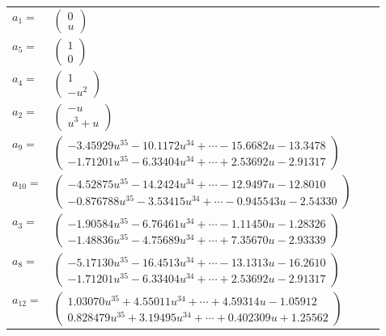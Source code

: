 \documentclass[1p]{elsarticle_modified}
\theoremstyle{definition}
\begin{document}
\begin{tabular}{m{7pt} m{180pt} m{7pt} m{180pt} }
\flushright $a_{1}=$&$\begin{pmatrix}0\\u\end{pmatrix}$ \\
\flushright $a_{5}=$&$\begin{pmatrix}1\\0\end{pmatrix}$ \\
\flushright $a_{4}=$&$\begin{pmatrix}1\\- u^2\end{pmatrix}$ \\
\flushright $a_{2}=$&$\begin{pmatrix}- u\\u^3+u\end{pmatrix}$ \\
\flushright $a_{9}=$&$\begin{pmatrix}-3.45929 u^{35}-10.1172 u^{34}+\cdots-15.6682 u-13.3478\\-1.71201 u^{35}-6.33404 u^{34}+\cdots+2.53692 u-2.91317\end{pmatrix}$ \\
\flushright $a_{10}=$&$\begin{pmatrix}-4.52875 u^{35}-14.2424 u^{34}+\cdots-12.9497 u-12.8010\\-0.876788 u^{35}-3.53415 u^{34}+\cdots-0.945543 u-2.54330\end{pmatrix}$ \\
\flushright $a_{3}=$&$\begin{pmatrix}-1.90584 u^{35}-6.76461 u^{34}+\cdots-1.11450 u-1.28326\\-1.48836 u^{35}-4.75689 u^{34}+\cdots+7.35670 u-2.93339\end{pmatrix}$ \\
\flushright $a_{8}=$&$\begin{pmatrix}-5.17130 u^{35}-16.4513 u^{34}+\cdots-13.1313 u-16.2610\\-1.71201 u^{35}-6.33404 u^{34}+\cdots+2.53692 u-2.91317\end{pmatrix}$ \\
\flushright $a_{12}=$&$\begin{pmatrix}1.03070 u^{35}+4.55011 u^{34}+\cdots+4.59314 u-1.05912\\0.828479 u^{35}+3.19495 u^{34}+\cdots+0.402309 u+1.25562\end{pmatrix}$ \\

\end{tabular}
\end{document}
